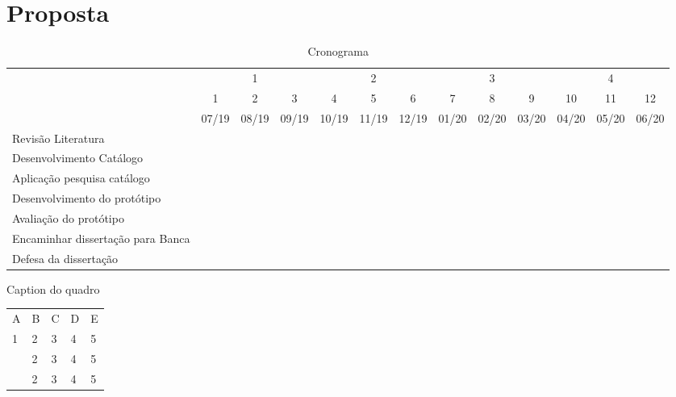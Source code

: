 \chapter{Proposta}
\label{chap:proposta}

\begin{table}[!htpb]
    \centering
    \caption{Cronograma}
    \label{tab:cronograma}
    \begin{scriptsize}
    \begin{tabular}{|p{2cm}|c|c|c|c|c|c|c|c|c|c|c|c|}\hline
         &\multicolumn{3}{c|}{1} &
        \multicolumn{3}{c|}{2} &
        \multicolumn{3}{c|}{3} &
        \multicolumn{3}{c|}{4}\\\cline{2-13}
         & 1 & 2 & 3 & 4 & 5 & 6 & 7 & 8 & 9 & 10 & 11 & 12\\\cline{2-13} 
         & 07/19 & 08/19 & 09/19 & 10/19 & 11/19 & 12/19 & 01/20 & 02/20 & 03/20 & 04/20 & 05/20 & 06/20 
         \\\hline    
         
         Revisão Literatura & \cellcolor{gray!50} & \cellcolor{gray!50} & \cellcolor{gray!50} &\cellcolor{gray!50} & \cellcolor{gray!50}& & & & & & & \\[10pt]\hline
         
         Desenvolvimento Catálogo & &\cellcolor{gray!50} &\cellcolor{gray!50} &\cellcolor{gray!50} & \cellcolor{gray!50}& \cellcolor{gray!50}& & & & & & \\[10pt]\hline    
         
         Aplicação pesquisa catálogo & & & & & & &\cellcolor{gray!50} &\cellcolor{gray!50} & & & & \\[10pt]\hline    
         
         Desenvolvimento do protótipo & & & & &\cellcolor{gray!50} &\cellcolor{gray!50} &\cellcolor{gray!50} &\cellcolor{gray!50} &\cellcolor{gray!50} & & & \\[10pt]\hline    
         
         Avaliação do protótipo & & & & & & & & &\cellcolor{gray!50} &\cellcolor{gray!50} & & \\[10pt]\hline    
         
         Encaminhar dissertação para Banca & & & & & & & & & & &\cellcolor{gray!50} & \\[10pt]\hline  
         
         Defesa da dissertação & & & & & & & & & & & &\cellcolor{gray!50} \\[10pt]\hline    
    \end{tabular}
    \end{scriptsize}
\end{table}


\begin{quadro}
\caption{Caption do quadro}
\label{quadro_modelo}
\centering
\begin{tabular}{|lllll|}
\cline{1-5}
A& B &  C& D &E  \\ \cline{1-5}
\multirow{3}{*}{1}  & 2 &  3& 4& 5 \\
 &  2 &  3& 4& 5  \\
 &  2 &  3& 4& 5 \\
 \cline{1-5}
\end{tabular}
\end{quadro}
